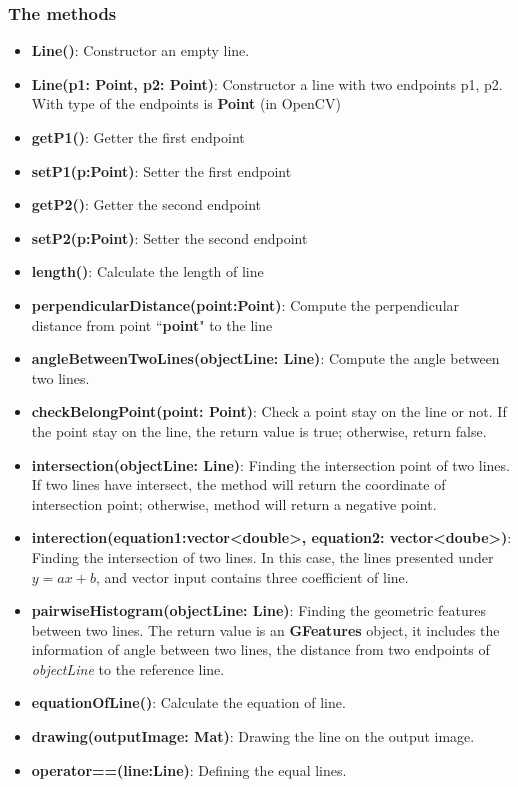 \subsubsection{The methods}
\begin{itemize}
\item\textbf{Line()}: Constructor an empty line.
\item\textbf{Line(p1: Point, p2: Point)}: Constructor a line with two endpoints p1, p2. With type of the endpoints is \textbf{Point} (in OpenCV)
\item\textbf{getP1()}: Getter the first endpoint 
\item\textbf{setP1(p:Point)}: Setter the first endpoint
\item\textbf{getP2()}: Getter the second endpoint 
\item\textbf{setP2(p:Point)}: Setter the second endpoint
\item\textbf{length()}: Calculate the length of line
\item\textbf{perpendicularDistance(point:Point)}: Compute the perpendicular distance from point ``\textbf{point}" to the line
\item\textbf{angleBetweenTwoLines(objectLine: Line)}: Compute the angle between two lines.
\item\textbf{checkBelongPoint(point: Point)}: Check a point stay on the line or not. If the point stay on the line, the return value is true; otherwise, return false.
\item\textbf{intersection(objectLine: Line)}: Finding the intersection point of two lines. If two lines have intersect, the method will return the coordinate of intersection point; otherwise, method will return a negative point.
\item\textbf{interection(equation1:vector<double>, equation2: vector<doube>)}: Finding the intersection of two lines. In this case, the lines presented under $y=ax + b$, and vector input contains three coefficient of line.
\item\textbf{pairwiseHistogram(objectLine: Line)}: Finding the geometric features between two lines. The return value is an \textbf{GFeatures} object, it includes the information of angle between two lines, the distance from two endpoints of \textit{objectLine} to the reference line.
\item\textbf{equationOfLine()}: Calculate the equation of line. 
\item\textbf{drawing(outputImage: Mat)}: Drawing the line on the output image.
\item\textbf{operator==(line:Line)}: Defining the equal lines.

\end{itemize}
